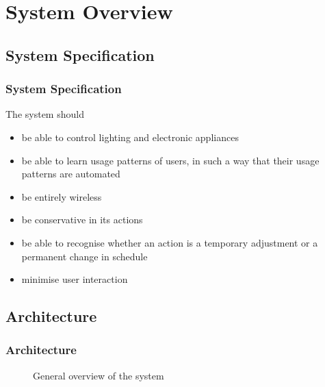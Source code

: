 \section{System Overview}
\subsection{System Specification}
\begin{frame}
	\frametitle{System Specification}
	The system should
	\begin{itemize}
	\item be able to control lighting and electronic appliances
	\item be able to learn usage patterns of users, in such a way that their usage patterns are automated
	\item be entirely wireless
	\item be conservative in its actions
	\item be able to recognise whether an action is a temporary adjustment or a permanent change in schedule
	\item minimise user interaction
	\end{itemize}
\end{frame}

\subsection{Architecture}
\begin{frame}
	\frametitle{Architecture}
  \begin{figure}[htbp]
    \centering
    \caption{General overview of the system}
  \end{figure}
\end{frame}

